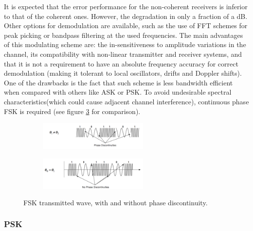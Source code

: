\documentclass[12pt,a4paper,openright]{article}
\begin{document}
It is expected that the error performance for the non-coherent receivers is inferior to that of the coherent ones. However, the degradation in only a fraction of a dB. Other options for demodulation are available, such as the use of FFT schemes for peak picking or bandpass filtering at the used frequencies. 
The main advantages of this modulating scheme are: the in-sensitiveness to amplitude variations in the channel, its compatibility with non-linear transmitter and receiver systems, and that it is not a requirement to have an absolute frequency accuracy for correct demodulation (making it tolerant to local oscillators, drifts and Doppler shifts). One of the drawbacks is the fact that such scheme is less bandwidth efficient when compared with others like ASK or PSK. To avoid undesirable spectral characteristics(which could cause adjacent channel interference), continuous phase FSK is required (see figure \ref{fig:comparecpfsk} for comparison).

 \begin{figure}[h]
 \centering
	\begin{subfigure}[h]{0.9\textwidth}
 \centering
    \includegraphics[width=0.6\textwidth]{ncpfsk.pdf}
    \label{fig:FSKcoherent}

	\end{subfigure}
	\quad

	\begin{subfigure}[h]{0.9\textwidth}
 	\centering
    \includegraphics[width=0.6\textwidth]{cpfsk.pdf}
    \label{fig:FSKnoncoherent}
 	\end{subfigure}
    \caption{FSK transmitted wave, with and without phase discontinuity\protect\cite{DigCommLec}.}
    \label{fig:comparecpfsk}
\end{figure}


\subsubsection{PSK}
\end{document}
